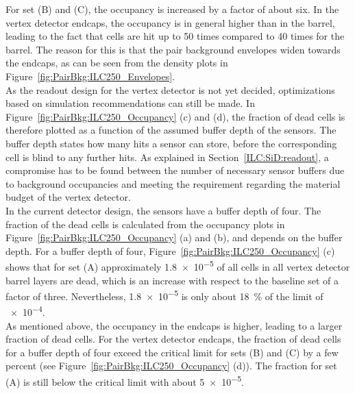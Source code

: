 For set (B) and (C), the occupancy is increased by a factor of about six.
In the vertex detector endcaps, the occupancy is in general higher than in the barrel, leading to the fact that cells are hit up to 50 times compared to 40 times for the barrel.
The reason for this is that the pair background envelopes widen towards the endcaps, as can be seen from the density plots in Figure~\ref{fig:PairBkg:ILC250_Envelopes}.
\\As the readout design for the vertex detector is not yet decided, optimizations based on simulation recommendations can still be made.
In Figure~\ref{fig:PairBkg:ILC250_Occupancy} (c) and (d), the fraction of dead cells is therefore plotted as a function of the assumed buffer depth of the sensors.
The buffer depth states how many hits a sensor can store, before the corresponding cell is blind to any further hits.
As explained in Section~\ref{ILC:SiD:readout}, a compromise has to be found between the number of necessary sensor buffers due to background occupancies and meeting the \sid requirement regarding the material budget of the vertex detector.
\\In the current detector design, the sensors have a buffer depth of four. 
The fraction of the dead cells is calculated from the occupancy plots in Figure~\ref{fig:PairBkg:ILC250_Occupancy} (a) and (b), and depends on the buffer depth.
For a buffer depth of four, Figure~\ref{fig:PairBkg:ILC250_Occupancy} (c) shows that for set (A) approximately \num{1.8e-5} of all cells in all vertex detector barrel layers are dead, which is an increase with respect to the baseline set of a factor of three.
Nevertheless, \num{1.8e-5} is only about \SI{18}{\percent} of the limit of \num{e-4}.
\\As mentioned above, the occupancy in the endcaps is higher, leading to a larger fraction of dead cells.
For the vertex detector endcaps, the fraction of dead cells for a buffer depth of four exceed the critical limit for sets (B) and (C) by a few percent (see Figure~\ref{fig:PairBkg:ILC250_Occupancy} (d)).
The fraction for set (A) is still below the critical limit with about \num{5e-5}.\\
